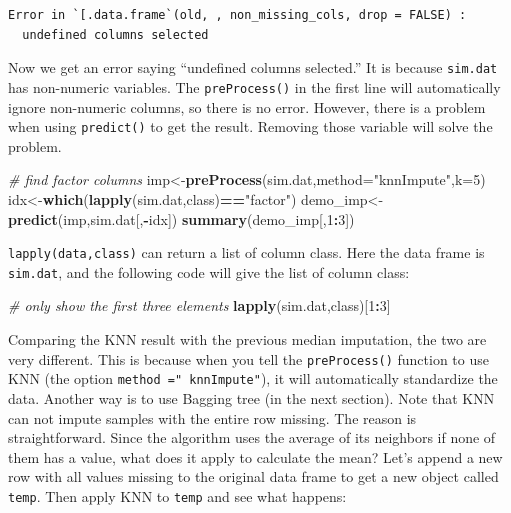 \documentclass[12pt,]{krantz}
\makeatletter
\newenvironment{Shaded}{\begin{snugshade}}{\end{snugshade}}
\newcommand{\KeywordTok}[1]{\textcolor[rgb]{0.27,0.27,0.27}{\textbf{#1}}}
\newcommand{\DataTypeTok}[1]{\textcolor[rgb]{0.27,0.27,0.27}{#1}}
\newcommand{\DecValTok}[1]{\textcolor[rgb]{0.06,0.06,0.06}{#1}}
\newcommand{\StringTok}[1]{\textcolor[rgb]{0.5,0.5,0.5}{#1}}
\newcommand{\CommentTok}[1]{\textcolor[rgb]{0.37,0.37,0.37}{\textit{#1}}}
\newcommand{\OperatorTok}[1]{\textcolor[rgb]{0.43,0.43,0.43}{\textbf{#1}}}
\newcommand{\NormalTok}[1]{#1}
\newenvironment{kframe}{%
\medskip{}
\setlength{\fboxsep}{.8em}
 \def\at@end@of@kframe{}%
 \ifinner\ifhmode%
  \def\at@end@of@kframe{\end{minipage}}%
  \begin{minipage}{\columnwidth}%
 \fi\fi%
 \def\FrameCommand##1{\hskip\@totalleftmargin \hskip-\fboxsep
 \colorbox{shadecolor}{##1}\hskip-\fboxsep
     \hskip-\linewidth \hskip-\@totalleftmargin \hskip\columnwidth}%
 \MakeFramed {\advance\hsize-\width
   \@totalleftmargin\z@ \linewidth\hsize
   \@setminipage}}%
 {\par\unskip\endMakeFramed%
 \at@end@of@kframe}
\renewenvironment{Shaded}{\begin{kframe}}{\end{kframe}}
\theoremstyle{definition}
\theoremstyle{definition}
\theoremstyle{definition}
\theoremstyle{remark}
\makeatother
\begin{document}
\begin{verbatim}
Error in `[.data.frame`(old, , non_missing_cols, drop = FALSE) : 
  undefined columns selected
\end{verbatim}

Now we get an error saying ``undefined columns selected.'' It is because
\texttt{sim.dat} has non-numeric variables. The \texttt{preProcess()} in
the first line will automatically ignore non-numeric columns, so there
is no error. However, there is a problem when using \texttt{predict()}
to get the result. Removing those variable will solve the problem.

\begin{Shaded}
\begin{Highlighting}[]
\CommentTok{# find factor columns}
\NormalTok{imp<-}\KeywordTok{preProcess}\NormalTok{(sim.dat,}\DataTypeTok{method=}\StringTok{"knnImpute"}\NormalTok{,}\DataTypeTok{k=}\DecValTok{5}\NormalTok{)}
\NormalTok{idx<-}\KeywordTok{which}\NormalTok{(}\KeywordTok{lapply}\NormalTok{(sim.dat,class)}\OperatorTok{==}\StringTok{"factor"}\NormalTok{)}
\NormalTok{demo_imp<-}\KeywordTok{predict}\NormalTok{(imp,sim.dat[,}\OperatorTok{-}\NormalTok{idx])}
\KeywordTok{summary}\NormalTok{(demo_imp[,}\DecValTok{1}\OperatorTok{:}\DecValTok{3}\NormalTok{])}
\end{Highlighting}
\end{Shaded}

\texttt{lapply(data,class)} can return a list of column class. Here the
data frame is \texttt{sim.dat}, and the following code will give the
list of column class:

\begin{Shaded}
\begin{Highlighting}[]
\CommentTok{# only show the first three elements}
\KeywordTok{lapply}\NormalTok{(sim.dat,class)[}\DecValTok{1}\OperatorTok{:}\DecValTok{3}\NormalTok{]}
\end{Highlighting}
\end{Shaded}

Comparing the KNN result with the previous median imputation, the two
are very different. This is because when you tell the
\texttt{preProcess()} function to use KNN (the option
\texttt{method\ ="\ knnImpute"}), it will automatically standardize the
data. Another way is to use Bagging tree (in the next section). Note
that KNN can not impute samples with the entire row missing. The reason
is straightforward. Since the algorithm uses the average of its
neighbors if none of them has a value, what does it apply to calculate
the mean? Let's append a new row with all values missing to the original
data frame to get a new object called \texttt{temp}. Then apply KNN to
\texttt{temp} and see what happens:
\end{document}
